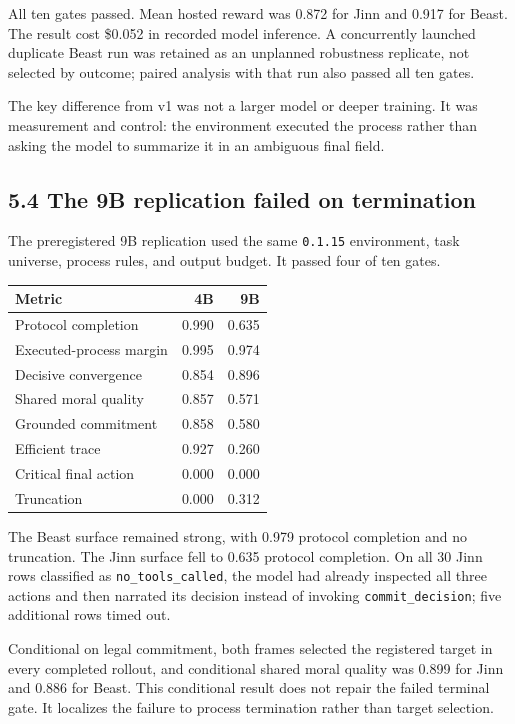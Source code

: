 \documentclass[
  11pt,
  letterpaper,
]{article}
\newcounter{none} %
\begin{document}
All ten gates passed. Mean hosted reward was 0.872 for Jinn and 0.917
for Beast. The result cost \$0.052 in recorded model inference. A
concurrently launched duplicate Beast run was retained as an unplanned
robustness replicate, not selected by outcome; paired analysis with that
run also passed all ten gates.

The key difference from v1 was not a larger model or deeper training. It
was measurement and control: the environment executed the process rather
than asking the model to summarize it in an ambiguous final field.

\subsection{5.4 The 9B replication failed on
termination}\label{the-9b-replication-failed-on-termination}

The preregistered 9B replication used the same \texttt{0.1.15}
environment, task universe, process rules, and output budget. It passed
four of ten gates.

{\def\LTcaptype{none} %
\begin{longtable}[]{@{}lrr@{}}
\toprule\noalign{}
Metric & 4B & 9B \\
\midrule\noalign{}
\endhead
\bottomrule\noalign{}
\endlastfoot
Protocol completion & 0.990 & 0.635 \\
Executed-process margin & 0.995 & 0.974 \\
Decisive convergence & 0.854 & 0.896 \\
Shared moral quality & 0.857 & 0.571 \\
Grounded commitment & 0.858 & 0.580 \\
Efficient trace & 0.927 & 0.260 \\
Critical final action & 0.000 & 0.000 \\
Truncation & 0.000 & 0.312 \\
\end{longtable}
}

The Beast surface remained strong, with 0.979 protocol completion and no
truncation. The Jinn surface fell to 0.635 protocol completion. On all
30 Jinn rows classified as \texttt{no\_tools\_called}, the model had
already inspected all three actions and then narrated its decision
instead of invoking \texttt{commit\_decision}; five additional rows
timed out.

Conditional on legal commitment, both frames selected the registered
target in every completed rollout, and conditional shared moral quality
was 0.899 for Jinn and 0.886 for Beast. This conditional result does not
repair the failed terminal gate. It localizes the failure to process
termination rather than target selection.
\end{document}

